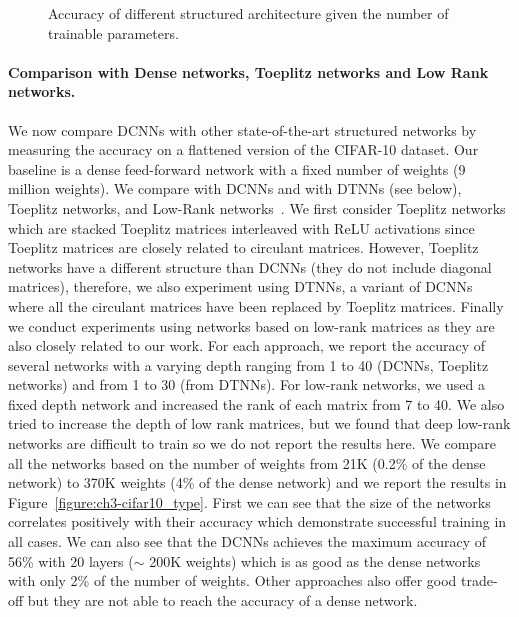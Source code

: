 \begin{figure}
   \centering
   
   \caption{Accuracy of different structured architecture given the number of trainable parameters.}
   \label{figure:ch3-cifar10_with_channels_xp}
\end{figure}


\paragraph{Comparison with Dense networks, Toeplitz networks and Low Rank networks.}
We now compare DCNNs with other state-of-the-art structured networks by measuring the accuracy on a flattened version of the CIFAR-10 dataset.
Our baseline is a dense feed-forward network with a fixed number of weights (9 million weights).
We compare with DCNNs and with DTNNs (see below), Toeplitz networks, and Low-Rank networks~\cite{8099498}.
We first consider Toeplitz networks which are stacked Toeplitz matrices interleaved with ReLU activations since Toeplitz matrices are closely related to circulant matrices.
However, Toeplitz networks have a different structure than DCNNs (they do not include diagonal matrices), therefore, we also experiment using DTNNs, a variant of DCNNs where all the circulant matrices have been replaced by Toeplitz matrices.
Finally we conduct experiments using networks based on low-rank matrices as they are also closely related to our work.
For each approach, we report the accuracy of several networks with a varying depth ranging from 1 to 40 (DCNNs, Toeplitz networks) and from 1 to 30 (from DTNNs).
For low-rank networks, we used a fixed depth network and increased the rank of each matrix from 7 to 40.
We also tried to increase the depth of low rank matrices, but we found that deep low-rank networks are difficult to train so we do not report the results here.
We compare all the networks based on the number of weights from 21K (0.2\% of the dense network) to 370K weights (4\% of the dense network) and we report the results in Figure~\ref{figure:ch3-cifar10_type}. 
First we can see that the size of the networks correlates positively with their accuracy which demonstrate successful training in all cases.
We can also see that the DCNNs achieves the maximum accuracy of 56\% with 20 layers ($\sim$ 200K weights) which is as good as the dense networks with only 2\% of the number of weights.
Other approaches also offer good trade-off but they are not able to reach the accuracy of a dense network.



